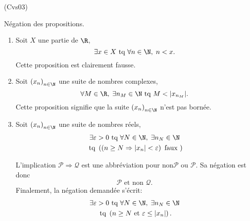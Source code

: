 \begin{tiny}(Cvs03)\end{tiny} Négation des propositions.
\begin{enumerate}
  \item Soit $X$ une partie de $\R$,
\begin{displaymath}
  \exists x \in X \text{ tq } \forall n\in \N,\; n < x.
\end{displaymath}
Cette proposition est clairement fausse.

  \item Soit $\left( x_n\right)_{n\in \N}$ une suite de nombres complexes,
\begin{displaymath}
  \forall M\in \R, \; \exists n_M \in \N \text{ tq } M < |x_{n_M}|.
\end{displaymath}
Cette proposition signifie que la suite $\left( x_n\right)_{n\in \N}$ n'est pas bornée.

  \item Soit $\left( x_n\right)_{n\in \N}$ une suite de nombres réels,
\begin{multline*}
  \exists \varepsilon >0 \text{ tq } \forall N\in \N, \; \exists n_N \in \N \\
  \text{ tq } \left( \left( n\geq N \Rightarrow |x_n| < \varepsilon\right) \text{ faux }\right) 
\end{multline*}

  L'implication $\mathcal{P} \Rightarrow \mathcal{Q}$ est une abbréviation pour $\text{non}\mathcal{P} \text{ ou } \mathcal{P}$. Sa négation est donc
\[
  \mathcal{P} \text{ et non } \mathcal{Q}.
\]
Finalement, la négation demandée s'écrit:
\begin{multline*}
  \exists \varepsilon >0 \text{ tq } \forall N\in \N, \; \exists n_N \in \N \\
  \text{ tq } \left( n \geq N  \text{ et } \varepsilon \leq |x_n| \right) .
\end{multline*}

\end{enumerate}
